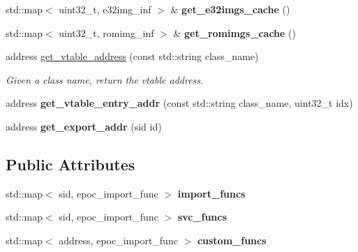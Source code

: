 \begin{DoxyCompactItemize}
std\+::map$<$ uint32\+\_\+t, e32img\+\_\+inf $>$ \& {\bfseries get\+\_\+e32imgs\+\_\+cache} ()
\item 
\mbox{\label{classeka2l1_1_1hle_1_1lib__manager_ad39455b019ad7526b6020a93a4a060a7}} 
std\+::map$<$ uint32\+\_\+t, romimg\+\_\+inf $>$ \& {\bfseries get\+\_\+romimgs\+\_\+cache} ()
\item 
address \mbox{\hyperlink{classeka2l1_1_1hle_1_1lib__manager_a2960c07d66c61b5db35647a49663fb51}{get\+\_\+vtable\+\_\+address}} (const std\+::string class\+\_\+name)
\begin{DoxyCompactList}\small\item\em Given a class name, return the vtable address. \end{DoxyCompactList}\item 
\mbox{\label{classeka2l1_1_1hle_1_1lib__manager_aad25104f0d16ee1278ce1f7d65604845}} 
address {\bfseries get\+\_\+vtable\+\_\+entry\+\_\+addr} (const std\+::string class\+\_\+name, uint32\+\_\+t idx)
\item 
\mbox{\label{classeka2l1_1_1hle_1_1lib__manager_a22d22efec438539c523ca032dced8008}} 
address {\bfseries get\+\_\+export\+\_\+addr} (sid id)
\end{DoxyCompactItemize}
\subsection*{Public Attributes}
\begin{DoxyCompactItemize}
\item 
\mbox{\label{classeka2l1_1_1hle_1_1lib__manager_ab5831c7e70f80f302d698a082bb7e836}} 
std\+::map$<$ sid, epoc\+\_\+import\+\_\+func $>$ {\bfseries import\+\_\+funcs}
\item 
\mbox{\label{classeka2l1_1_1hle_1_1lib__manager_a51f7e262a47e0098f0d630b5db669b15}} 
std\+::map$<$ sid, epoc\+\_\+import\+\_\+func $>$ {\bfseries svc\+\_\+funcs}
\item 
\mbox{\label{classeka2l1_1_1hle_1_1lib__manager_a47944b6f6fb1e19d822d918b48ca5e79}} 
std\+::map$<$ address, epoc\+\_\+import\+\_\+func $>$ {\bfseries custom\+\_\+funcs}
\end{DoxyCompactItemize}


